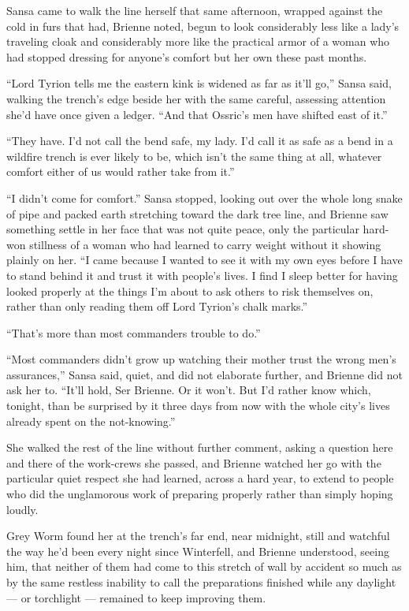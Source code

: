 \sceneBreak

Sansa came to walk the line herself that same afternoon, wrapped against the cold in furs that had, Brienne noted, begun to look considerably less like a lady’s traveling cloak and considerably more like the practical armor of a woman who had stopped dressing for anyone’s comfort but her own these past months.

“Lord Tyrion tells me the eastern kink is widened as far as it’ll go,” Sansa said, walking the trench’s edge beside her with the same careful, assessing attention she’d have once given a ledger. “And that Ossric’s men have shifted east of it.”

“They have. I’d not call the bend safe, my lady. I’d call it as safe as a bend in a wildfire trench is ever likely to be, which isn’t the same thing at all, whatever comfort either of us would rather take from it.”

“I didn’t come for comfort.” Sansa stopped, looking out over the whole long snake of pipe and packed earth stretching toward the dark tree line, and Brienne saw something settle in her face that was not quite peace, only the particular hard-won stillness of a woman who had learned to carry weight without it showing plainly on her. “I came because I wanted to see it with my own eyes before I have to stand behind it and trust it with people’s lives. I find I sleep better for having looked properly at the things I’m about to ask others to risk themselves on, rather than only reading them off Lord Tyrion’s chalk marks.”

“That’s more than most commanders trouble to do.”

“Most commanders didn’t grow up watching their mother trust the wrong men’s assurances,” Sansa said, quiet, and did not elaborate further, and Brienne did not ask her to. “It’ll hold, Ser Brienne. Or it won’t. But I’d rather know which, tonight, than be surprised by it three days from now with the whole city’s lives already spent on the not-knowing.”

She walked the rest of the line without further comment, asking a question here and there of the work-crews she passed, and Brienne watched her go with the particular quiet respect she had learned, across a hard year, to extend to people who did the unglamorous work of preparing properly rather than simply hoping loudly.

\sceneBreak

Grey Worm found her at the trench’s far end, near midnight, still and watchful the way he’d been every night since Winterfell, and Brienne understood, seeing him, that neither of them had come to this stretch of wall by accident so much as by the same restless inability to call the preparations finished while any daylight — or torchlight — remained to keep improving them.


